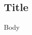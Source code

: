 \documentclass[../../main/main.tex]{subfiles}
\begin{document}
\subsection*{Title}

Body

\printbibliography
\end{document}
